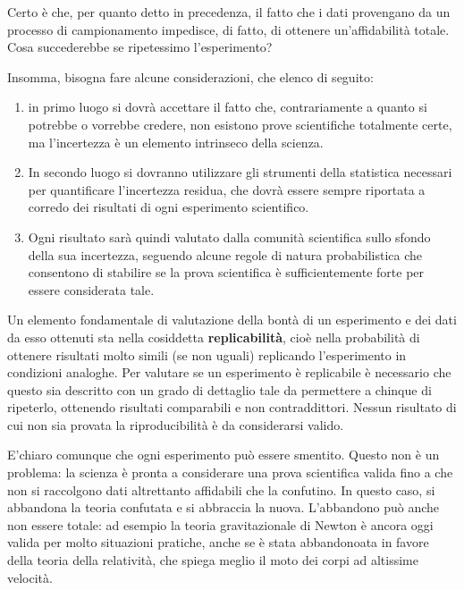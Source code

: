 \documentclass[a4paper,12pt,oneside]{book}
\providecommand{\tightlist}{%
  \setlength{\itemsep}{0pt}\setlength{\parskip}{0pt}}
\begin{document}
Certo è che, per quanto detto in precedenza, il fatto che i dati
provengano da un processo di campionamento impedisce, di fatto, di
ottenere un'affidabilità totale. Cosa succederebbe se ripetessimo
l'esperimento?

Insomma, bisogna fare alcune considerazioni, che elenco di seguito:

\begin{enumerate}
\def\labelenumi{\arabic{enumi}.}
\tightlist
\item
  in primo luogo si dovrà accettare il fatto che, contrariamente a
  quanto si potrebbe o vorrebbe credere, non esistono prove scientifiche
  totalmente certe, ma l'incertezza è un elemento intrinseco della
  scienza.
\item
  In secondo luogo si dovranno utilizzare gli strumenti della statistica
  necessari per quantificare l'incertezza residua, che dovrà essere
  sempre riportata a corredo dei risultati di ogni esperimento
  scientifico.
\item
  Ogni risultato sarà quindi valutato dalla comunità scientifica sullo
  sfondo della sua incertezza, seguendo alcune regole di natura
  probabilistica che consentono di stabilire se la prova scientifica è
  sufficientemente forte per essere considerata tale.
\end{enumerate}

Un elemento fondamentale di valutazione della bontà di un esperimento e
dei dati da esso ottenuti sta nella cosiddetta \textbf{replicabilità},
cioè nella probabilità di ottenere risultati molto simili (se non
uguali) replicando l'esperimento in condizioni analoghe. Per valutare se
un esperimento è replicabile è necessario che questo sia descritto con
un grado di dettaglio tale da permettere a chinque di ripeterlo,
ottenendo risultati comparabili e non contraddittori. Nessun risultato
di cui non sia provata la riproducibilità è da considerarsi valido.

E'chiaro comunque che ogni esperimento può essere smentito. Questo non è
un problema: la scienza è pronta a considerare una prova scientifica
valida fino a che non si raccolgono dati altrettanto affidabili che la
confutino. In questo caso, si abbandona la teoria confutata e si
abbraccia la nuova. L'abbandono può anche non essere totale: ad esempio
la teoria gravitazionale di Newton è ancora oggi valida per molto
situazioni pratiche, anche se è stata abbandonoata in favore della
teoria della relatività, che spiega meglio il moto dei corpi ad
altissime velocità.
\end{document}
